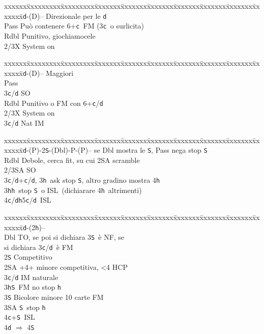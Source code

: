 \documentclass[a4paper,italian]{article}
\newcommand{\BS}{\small{\texttt{S}}}
\newcommand{\BC}{\small{\texttt{c}}}
\newcommand{\BD}{\small{\texttt{d}}}
\newcommand{\BH}{\small{\texttt{h}}}
\newenvironment{bidtable}
{\begin{tabbing}

    xxxxxx\=xxxxxxxxx\=xxxxxxxxx\=xxxxxxx\=xxxxxxx\=xxxxxxx\=xxxxxxx\=xxxxxxx\=xxxxxxx\=xxxxxxx\=\kill}
{\end{tabbing} }%
\begin{document}
\begin{multicols}{2}
    \begin{bidtable}
        2\BD-(D)-- \>\> Direzionale per le \BD \+\\
        Pass \> Può contenere 6+\BC\ FM (3\BC\ o surlicita)\\
        Rdbl \> Punitivo, giochiamocele\\
        2/3X \> System on
    \end{bidtable}
    \begin{bidtable}
        2\BD-(D)-- \>\> Maggiori\+\\
        Pass\+\\
        3\BC/\BD \> SO\-\\
        Rdbl \> Punitivo o FM con 6+\BC /\BD \\
        2/3X \> System on\\
        3\BC/\BD \> Nat IM\-
    \end{bidtable}
    \begin{bidtable}
        2\BD-(P)-2\BS-(Dbl)-P-(P)-- se Dbl mostra le \BS, Pass nega stop \BS\+\\
        Rdbl \> Debole, cerca fit, su cui 2\small{SA} scramble\\
        2/3\small{SA} \> SO\\
        3\BC/\BD {}+\BC/\BD, 3\BH\ ask stop \BS, altro gradino mostra 4\BH\\
        3\BH {}\BH\ stop \BS\ o ISL\ (dichiarare 4\BH\ altrimenti)\\
        4\BC/\BD {}\BH5\BC/\BD\ ISL
    \end{bidtable}
    \begin{bidtable}
        2\BD-(2\BH)--\+\\
        Dbl \> TO, se poi si dichiara 3\BS\ è NF, se\+\\\-si dichiara 3\BC/\BD\ è FM\\
        2\BS \> Competitivo\\
        2\small{SA} +4+ minore competitiva, <4 HCP\\
        3\BC/\BD \> IM naturale\\
        3\BH {}\BS\ FM no stop \BH \\
        3\BS \> Bicolore minore 10 carte FM\\
        3\small{SA} \BS\ stop \BH \\
        4\BC {}+\BS\ ISL\\
        4\BD \> $\Rightarrow$ 4\BS \-
    \end{bidtable}

\end{multicols}
\end{document}

